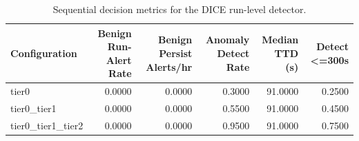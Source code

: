 \begin{table}[t]
\centering
\caption{Sequential decision metrics for the DICE run-level detector.}
\label{tab:dice_sequential_metrics}
\footnotesize
\begin{tabular}{lrrrrr}
\toprule
Configuration & Benign Run-Alert Rate & Benign Persist Alerts/hr & Anomaly Detect Rate & Median TTD (s) & Detect <=300s \\
\midrule
tier0 & 0.0000 & 0.0000 & 0.3000 & 91.0000 & 0.2500 \\
tier0_tier1 & 0.0000 & 0.0000 & 0.5500 & 91.0000 & 0.4500 \\
tier0_tier1_tier2 & 0.0000 & 0.0000 & 0.9500 & 91.0000 & 0.7500 \\
\bottomrule
\end{tabular}

\end{table}
